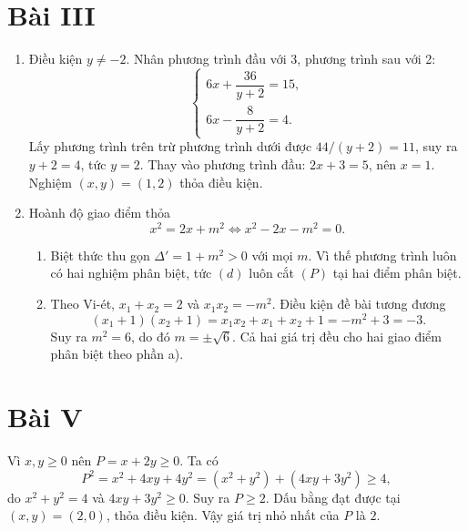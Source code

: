 \documentclass[12pt,a4paper]{article}
\begin{document}
\section*{Bài III}
\begin{enumerate}
\item Điều kiện $y\ne-2$. Nhân phương trình đầu với 3, phương trình sau với 2:
\[
\begin{cases}
6x+\dfrac{36}{y+2}=15,\\[3pt]
6x-\dfrac8{y+2}=4.
\end{cases}
\]
Lấy phương trình trên trừ phương trình dưới được $44/(y+2)=11$, suy ra $y+2=4$, tức $y=2$. Thay vào phương trình đầu: $2x+3=5$, nên $x=1$. Nghiệm $(x,y)=(1,2)$ thỏa điều kiện.
\item Hoành độ giao điểm thỏa
\[
x^2=2x+m^2\iff x^2-2x-m^2=0.
\]
\begin{enumerate}[label=\alph*)]
\item Biệt thức thu gọn $\Delta'=1+m^2>0$ với mọi $m$. Vì thế phương trình luôn có hai nghiệm phân biệt, tức $(d)$ luôn cắt $(P)$ tại hai điểm phân biệt.
\item Theo Vi-ét, $x_1+x_2=2$ và $x_1x_2=-m^2$. Điều kiện đề bài tương đương
\[
(x_1+1)(x_2+1)=x_1x_2+x_1+x_2+1=-m^2+3=-3.
\]
Suy ra $m^2=6$, do đó $m=\pm\sqrt6$. Cả hai giá trị đều cho hai giao điểm phân biệt theo phần a).
\end{enumerate}
\end{enumerate}

\section*{Bài V}
Vì $x,y\ge0$ nên $P=x+2y\ge0$. Ta có
\[
P^2=x^2+4xy+4y^2=(x^2+y^2)+(4xy+3y^2)\ge4,
\]
do $x^2+y^2=4$ và $4xy+3y^2\ge0$. Suy ra $P\ge2$. Dấu bằng đạt được tại $(x,y)=(2,0)$, thỏa điều kiện. Vậy giá trị nhỏ nhất của $P$ là $2$.
\end{document}
